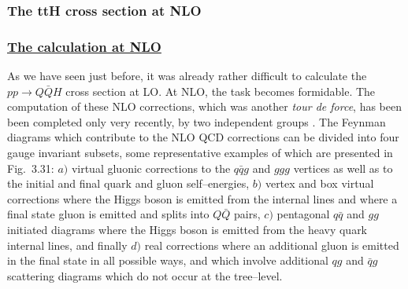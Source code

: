 \subsubsection{The ttH cross section at NLO}

\subsubsection*{\underline{The calculation at NLO}}

As we have seen just before, it was already rather difficult to calculate the
$pp \to Q \bar Q H$ cross section at LO. At NLO, the task becomes formidable. 
The computation of these NLO corrections, which  was another {\it tour de
force}, has been been completed only very recently, by two independent groups
\cite{Htt-NLO-DESY,Htt-NLO-US}. The Feynman diagrams which
contribute to the NLO QCD corrections can be divided into four gauge invariant
subsets, some representative examples of which are presented in Fig.~3.31: $a)$
virtual gluonic corrections to the $q \bar q g$ and $ggg$ vertices as well as
to the initial and final quark and gluon self--energies, $b)$ vertex and box
virtual corrections where the Higgs boson is emitted from the internal lines
and where a final state gluon is emitted and splits into $Q\bar Q$ pairs, $c)$
pentagonal $q\bar q$ and $gg$ initiated diagrams where the Higgs boson is
emitted from the heavy quark internal lines, and finally $d)$ real corrections
where an additional gluon is emitted in the final state in all possible ways,
and which involve additional $qg$ and $\bar q g$ scattering diagrams which do
not occur at the tree--level.\s


